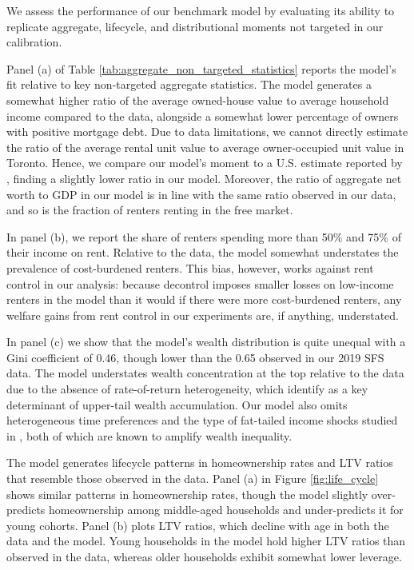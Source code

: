 \documentclass[parskip=full]{article}
\begin{document}
We assess the performance of our benchmark model by evaluating its ability to replicate aggregate, lifecycle, and distributional moments not targeted in our calibration. 

Panel (a) of Table \ref{tab:aggregate_non_targeted_statistics} reports the model's fit relative to key non-targeted aggregate statistics. The model generates a somewhat higher ratio of the average owned-house value to average household income compared to the data, alongside a somewhat lower percentage of owners with positive mortgage debt. Due to data limitations, we cannot directly estimate the ratio of the average rental unit value to average owner-occupied unit value in Toronto. Hence, we compare our model's moment to a U.S. estimate reported by \citet{chatterjee-eyigungor-2015}, finding a slightly lower ratio in our model. Moreover, the ratio of aggregate net worth to GDP in our model is in line with the same ratio observed in our data, and so is the fraction of renters renting in the free market.

In panel (b), we report the share of renters spending more than 50\% and 75\% of their income on rent. Relative to the data, the model somewhat understates the prevalence of cost-burdened renters. This bias, however, works against rent control in our analysis: because decontrol imposes smaller losses on low-income renters in the model than it would if there were more cost-burdened renters, any welfare gains from rent control in our experiments are, if anything, understated.

In panel (c) we show that the model's wealth distribution is quite unequal with a Gini coefficient of 0.46, though lower than the 0.65 observed in our 2019 SFS data. The model understates wealth concentration at the top relative to the data due to the absence of rate-of-return heterogeneity, which \citet{fagereng} identify as a key determinant of upper-tail wealth accumulation. Our model also omits heterogeneous time preferences \citep{ks-1998} and the type of fat-tailed income shocks studied in \citet{mj-shocks}, both of which are known to amplify wealth inequality.

The model generates lifecycle patterns in homeownership rates and LTV ratios that resemble those observed in the data. Panel (a) in Figure \ref{fig:life_cycle} shows similar patterns in homeownership rates, though the model slightly over-predicts homeownership among middle-aged households and under-predicts it for young cohorts. Panel (b) plots LTV ratios, which decline with age in both the data and the model. Young households in the model hold higher LTV ratios than observed in the data, whereas older households exhibit somewhat lower leverage.
\end{document}
